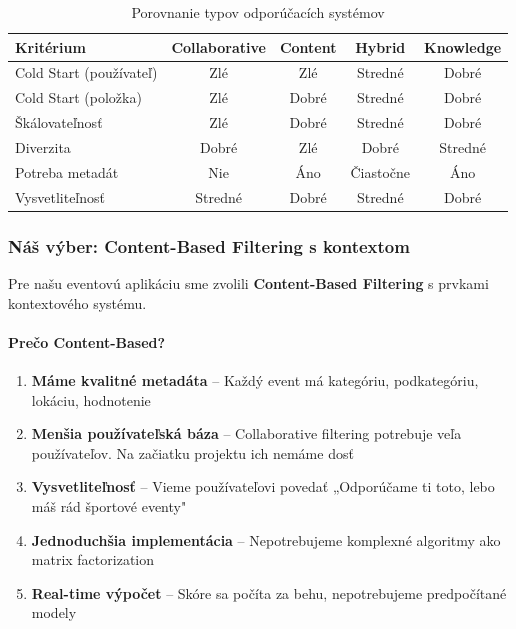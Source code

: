 \begin{table}[H]
\centering
\begin{tabular}{|l|c|c|c|c|}
\hline
\textbf{Kritérium} & \textbf{Collaborative} & \textbf{Content} & \textbf{Hybrid} & \textbf{Knowledge} \\
\hline
Cold Start (používateľ) & Zlé & Zlé & Stredné & Dobré \\
\hline
Cold Start (položka) & Zlé & Dobré & Stredné & Dobré \\
\hline
Škálovateľnosť & Zlé & Dobré & Stredné & Dobré \\
\hline
Diverzita & Dobré & Zlé & Dobré & Stredné \\
\hline
Potreba metadát & Nie & Áno & Čiastočne & Áno \\
\hline
Vysvetliteľnosť & Stredné & Dobré & Stredné & Dobré \\
\hline
\end{tabular}
\caption{Porovnanie typov odporúčacích systémov}
\end{table}

\subsubsection{Náš výber: Content-Based Filtering s kontextom}

Pre našu eventovú aplikáciu sme zvolili \textbf{Content-Based Filtering} s prvkami kontextového systému.

\paragraph{Prečo Content-Based?}

\begin{enumerate}
    \item \textbf{Máme kvalitné metadáta} -- Každý event má kategóriu, podkategóriu, lokáciu, hodnotenie

    \item \textbf{Menšia používateľská báza} -- Collaborative filtering potrebuje veľa používateľov. Na začiatku projektu ich nemáme dosť

    \item \textbf{Vysvetliteľnosť} -- Vieme používateľovi povedať „Odporúčame ti toto, lebo máš rád športové eventy"

    \item \textbf{Jednoduchšia implementácia} -- Nepotrebujeme komplexné algoritmy ako matrix factorization

    \item \textbf{Real-time výpočet} -- Skóre sa počíta za behu, nepotrebujeme predpočítané modely
\end{enumerate}

